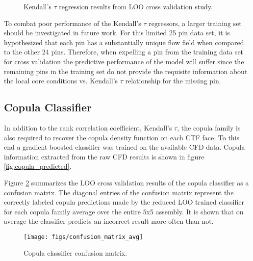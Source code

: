 \begin{figure}[H]%
    \centering
    \qquad
    \qquad
    \qquad
    \qquad
    \caption[Kendall's $\tau$ regression LOO results.]{Kendall's $\tau$ regression results from LOO cross validation study.}%
    \label{fig:ktauregression}%
\end{figure}
To combat poor performance of the Kendall's $\tau$ regressors, a larger training set should be investigated in future work.  For this limited 25 pin data set, it is hypothesized that each pin has a substantially unique flow field when compared to the other 24 pins.  Therefore, when expelling a pin from the training data set for cross validation the predictive performance of the model will suffer since the remaining pins in the training set do not provide the requisite information about the local core conditions vs. Kendall's $\tau$ relationship for the missing pin.

\subsection{Copula Classifier}

In addition to the rank correlation coefficient, Kendall's $\tau$, the copula family is also required to recover the copula density function on each CTF face.  To this end a gradient boosted classifier was trained on the available CFD data.  Copula information extracted from the raw CFD results is shown in figure \ref{fig:copula_predicted}.

Figure \ref{fig:confusionmatrixavg} summarizes the LOO cross validation results of the copula classifier as a confusion matrix.  The diagonal entries of the confusion matrix represent the correctly labeled copula predictions made by the reduced LOO trained classifier for each copula family average over the entire 5x5 assembly.  It is shown that on average the classifier predicts an incorrect result more often than not.  

\begin{figure}[H]
    \centering
    \texttt{[image: figs/confusion\_matrix\_avg]}
    \caption[Copula classifier confusion matrix.]{Copula classifier confusion matrix.}
    \label{fig:confusionmatrixavg}
\end{figure}


